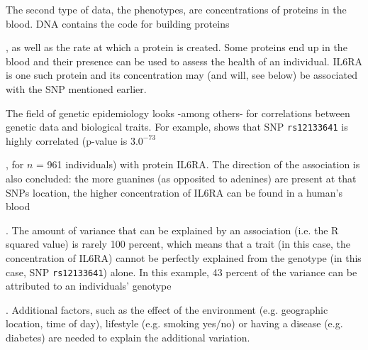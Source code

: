 The second type of data, the phenotypes, 
are concentrations of proteins in the blood. 
DNA contains the code for building proteins

, as well as the rate
at which a protein is created. Some proteins end up in the blood and
their presence can be used to assess the health of an individual.
IL6RA is one such protein and its concentration may (and will, see below)
be associated with the SNP mentioned earlier.

The field of genetic epidemiology looks -among others- for
correlations between genetic data and biological traits.
For example, \cite{ahsan2017relative} shows that
SNP \verb|rs12133641| is highly correlated (p-value is $3.0^{-73}$

,
for $n$ = 961 individuals) with protein IL6RA.
The direction of the association is also concluded:
the more guanines (as opposited to adenines) are present at that SNPs location,
the higher concentration of IL6RA can be found in a human's blood

. The amount of variance that can be explained by an association (i.e.
the R squared value) is rarely 100 percent, which means that a trait (in
this case, the concentration of IL6RA) cannot be perfectly explained
from the genotype (in this case, SNP \verb|rs12133641|) alone. 
In this example, 43 percent of the variance 
can be attributed to an individuals' genotype

. Additional factors, 
such as the effect
of the environment (e.g. geographic location, time of day), 
lifestyle (e.g. smoking yes/no) or having a disease (e.g. diabetes) 
are needed to explain the additional variation.


